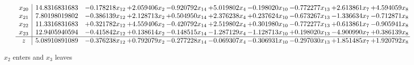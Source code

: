 \documentclass[10pt]{article}
\begin{document}
\[\begin{array}{c| c c@{\hskip 2pt} c@{\hskip 2pt} c@{\hskip 2pt} c@{\hskip 2pt} c@{\hskip 2pt} c@{\hskip 2pt} c@{\hskip 2pt} c@{\hskip 2pt} }
 x_{20}   &  14.8316831683 & -0.178218 x_{12} & + 2.059406 x_{2} & -0.920792 x_{14} & + 5.019802 x_{4} & -0.198020 x_{10} & -0.772277 x_{13} & + 2.613861 x_{7} & + 4.594059 x_{8}\\
 x_{21}   &  7.80198019802 & -0.386139 x_{12} & + 2.128713 x_{2} & + 0.504950 x_{14} & + 2.376238 x_{4} & + 0.237624 x_{10} & -0.673267 x_{13} & -1.336634 x_{7} & -0.712871 x_{8}\\
 x_{22}   &  11.3316831683 & + 0.321782 x_{12} & + 4.559406 x_{2} & -0.420792 x_{14} & + 2.519802 x_{4} & + 0.301980 x_{10} & -0.772277 x_{13} & + 0.613861 x_{7} & -0.905941 x_{8}\\
 x_{23}   &  12.9405940594 & -0.415842 x_{12} & + 0.138614 x_{2} & -0.148515 x_{14} & -1.287129 x_{4} & -1.128713 x_{10} & + 0.198020 x_{13} & -4.900990 x_{7} & + 0.386139 x_{8}\\
\hline
z    &  5.08910891089 & -0.376238 x_{12} & + 0.792079 x_{2} & -0.277228 x_{14} & -0.069307 x_{4} & -0.306931 x_{10} & -0.297030 x_{13} & + 1.851485 x_{7} & + 1.920792 x_{8}\\
\end{array}\]


 $ x_{2} $ enters and $ x_{3} $ leaves 
\end{document}
